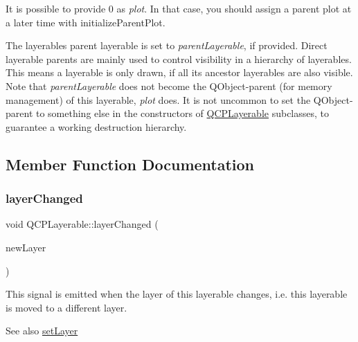 It is possible to provide 0 as {\itshape plot}. In that case, you should assign a parent plot at a later time with initialize\+Parent\+Plot.

The layerable\textquotesingle{}s parent layerable is set to {\itshape parent\+Layerable}, if provided. Direct layerable parents are mainly used to control visibility in a hierarchy of layerables. This means a layerable is only drawn, if all its ancestor layerables are also visible. Note that {\itshape parent\+Layerable} does not become the Q\+Object-\/parent (for memory management) of this layerable, {\itshape plot} does. It is not uncommon to set the Q\+Object-\/parent to something else in the constructors of \hyperlink{class_q_c_p_layerable}{Q\+C\+P\+Layerable} subclasses, to guarantee a working destruction hierarchy. 

\subsection{Member Function Documentation}
\mbox{\label{class_q_c_p_layerable_abbf8657cedea73ac1c3499b521c90eba}} 
\subsubsection{\texorpdfstring{layer\+Changed}{layerChanged}}
{\footnotesize\ttfamily void Q\+C\+P\+Layerable\+::layer\+Changed (\begin{DoxyParamCaption}\item[{\hyperlink{class_q_c_p_layer}{Q\+C\+P\+Layer} $\ast$}]{new\+Layer }\end{DoxyParamCaption})\hspace{0.3cm}{\ttfamily [signal]}}

This signal is emitted when the layer of this layerable changes, i.\+e. this layerable is moved to a different layer.

\begin{DoxySeeAlso}{See also}
\hyperlink{class_q_c_p_layerable_ab0d0da6d2de45a118886d2c8e16d5a54}{set\+Layer} 
\end{DoxySeeAlso}
\mbox{\label{class_q_c_p_layerable_a4171e2e823aca242dd0279f00ed2de81}} 
